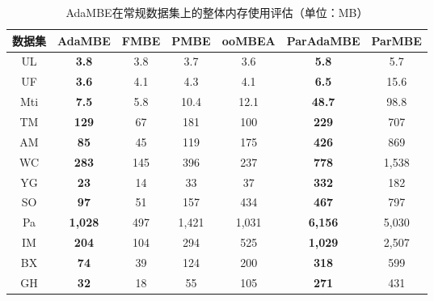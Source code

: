\begin{table} [H]
	\centering    
	\setlength{\abovecaptionskip}{0cm}  
  \setlength{\belowcaptionskip}{-0.1cm}
	\caption{AdaMBE在常规数据集上的整体内存使用评估（单位：MB）}      
	\label{tbl:ada_memory}
	\setlength{\tabcolsep}{5pt}
	\begin{center}
				\normalsize{
		\begin{tabular}{|c|c|c|c|c||c|c|}
			\hline 

      \textbf{数据集} & \textbf{AdaMBE} & \textbf{FMBE} & \textbf{PMBE} & \textbf{ooMBEA} & \textbf{ParAdaMBE} & \textbf{ParMBE} \\ \hline

      UL & \textbf{3.8} & 3.8 & 3.7 & 3.6 & \textbf{5.8} & 5.7 \\
      UF & \textbf{3.6} & 4.1 & 4.3 & 4.1 & \textbf{6.5} & 15.6 \\
      Mti & \textbf{7.5} & 5.8 & 10.4 & 12.1 & \textbf{48.7} & 98.8 \\
      TM & \textbf{129} & 67 & 181 & 100 & \textbf{229} & 707 \\
      AM & \textbf{85} & 45 & 119 & 175 & \textbf{426} & 869 \\
      WC & \textbf{283} & 145 & 396 & 237 & \textbf{778} & 1,538 \\
      YG & \textbf{23} & 14 & 33 & 37 & \textbf{332} & 182 \\
      SO & \textbf{97} & 51 & 157 & 434 & \textbf{467} & 797 \\
      Pa & \textbf{1,028} & 497 & 1,421 & 1,031 & \textbf{6,156} & 5,030 \\
      IM & \textbf{204} & 104 & 294 & 525 & \textbf{1,029} & 2,507 \\
      BX & \textbf{74} & 39 & 124 & 200 & \textbf{318} & 599 \\
      GH & \textbf{32} & 18 & 55 & 105 & \textbf{271} & 431 \\
      
      \hline
      
		\end{tabular}
				}
	\end{center}
  \vspace{-8pt}
\end{table}
